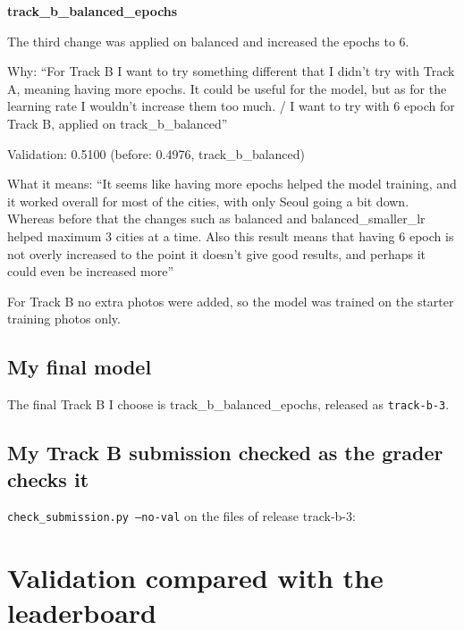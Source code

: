 \documentclass[11pt]{article}
\begin{document}
{\par\medskip\noindent\textbf{track\_b\_balanced\_epochs}\par
The third change was applied on balanced and increased the epochs to 6.\par
Why: ``For Track B I want to try something different that I didn't try with Track A, meaning having more epochs. It could be useful for the model, but as for the learning rate I wouldn't increase them too much. / I want to try with 6 epoch for Track B, applied on track\_b\_balanced''\par
Validation: 0.5100 (before: 0.4976, track\_b\_balanced)\par
What it means: ``It seems like having more epochs helped the model training, and it worked overall for most of the cities, with only Seoul going a bit down. Whereas before that the changes such as balanced and balanced\_smaller\_lr helped maximum 3 cities at a time. Also this result means that having 6 epoch is not overly increased to the point it doesn't give good results, and perhaps it could even be increased more''
\par}

For Track B no extra photos were added, so the model was trained on the starter training photos only.

\subsection*{My final model}
The final Track B I choose is track\_b\_balanced\_epochs, released as \texttt{track-b-3}.

\subsection*{My Track B submission checked as the grader checks it}
\texttt{check\_submission.py --no-val} on the files of release track-b-3:

\section*{Validation compared with the leaderboard}
\end{document}
